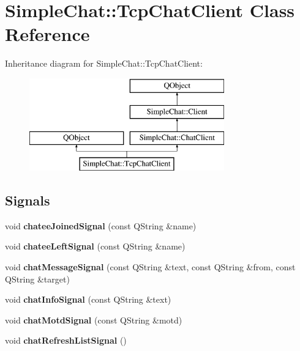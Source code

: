 \hypertarget{classSimpleChat_1_1TcpChatClient}{\section{Simple\-Chat\-:\-:Tcp\-Chat\-Client Class Reference}
\label{classSimpleChat_1_1TcpChatClient}
}
Inheritance diagram for Simple\-Chat\-:\-:Tcp\-Chat\-Client\-:\begin{figure}[H]
\begin{center}
\leavevmode
\includegraphics[height=4.000000cm]{classSimpleChat_1_1TcpChatClient}
\end{center}
\end{figure}
\subsection*{Signals}
\begin{DoxyCompactItemize}
\item 
\hypertarget{classSimpleChat_1_1TcpChatClient_ad227e90be4ba4c6c4ca05e6dc0f910ee}{void {\bfseries chatee\-Joined\-Signal} (const Q\-String \&name)}\label{classSimpleChat_1_1TcpChatClient_ad227e90be4ba4c6c4ca05e6dc0f910ee}

\item 
\hypertarget{classSimpleChat_1_1TcpChatClient_a9b92c990073439c47e147b3e6f2bfc2c}{void {\bfseries chatee\-Left\-Signal} (const Q\-String \&name)}\label{classSimpleChat_1_1TcpChatClient_a9b92c990073439c47e147b3e6f2bfc2c}

\item 
\hypertarget{classSimpleChat_1_1TcpChatClient_a361335d681dd4de2bb0b2ce4e34ff95f}{void {\bfseries chat\-Message\-Signal} (const Q\-String \&text, const Q\-String \&from, const Q\-String \&target)}\label{classSimpleChat_1_1TcpChatClient_a361335d681dd4de2bb0b2ce4e34ff95f}

\item 
\hypertarget{classSimpleChat_1_1TcpChatClient_a78428ed1c3f1dd6f9c28497c7f2bfa2a}{void {\bfseries chat\-Info\-Signal} (const Q\-String \&text)}\label{classSimpleChat_1_1TcpChatClient_a78428ed1c3f1dd6f9c28497c7f2bfa2a}

\item 
\hypertarget{classSimpleChat_1_1TcpChatClient_ae36b13ea9eaa5787c75f3f911e2afd68}{void {\bfseries chat\-Motd\-Signal} (const Q\-String \&motd)}\label{classSimpleChat_1_1TcpChatClient_ae36b13ea9eaa5787c75f3f911e2afd68}

\item 
\hypertarget{classSimpleChat_1_1TcpChatClient_a3d7860281a1ab069e5eaf367ba93b54d}{void {\bfseries chat\-Refresh\-List\-Signal} ()}\label{classSimpleChat_1_1TcpChatClient_a3d7860281a1ab069e5eaf367ba93b54d}

\end{DoxyCompactItemize}
